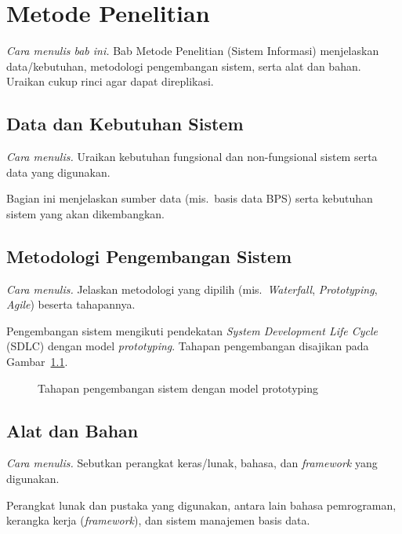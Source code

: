 \chapter{Metode Penelitian}
\emph{Cara menulis bab ini.} Bab Metode Penelitian (Sistem Informasi) menjelaskan data/kebutuhan, metodologi pengembangan sistem, serta alat dan bahan. Uraikan cukup rinci agar dapat direplikasi.


\section{Data dan Kebutuhan Sistem}
\emph{Cara menulis.} Uraikan kebutuhan fungsional dan non-fungsional sistem serta data yang digunakan.

Bagian ini menjelaskan sumber data (mis.\ basis data BPS) serta kebutuhan sistem
yang akan dikembangkan.

\section{Metodologi Pengembangan Sistem}
\emph{Cara menulis.} Jelaskan metodologi yang dipilih (mis.\ \emph{Waterfall}, \emph{Prototyping}, \emph{Agile}) beserta tahapannya.

Pengembangan sistem mengikuti pendekatan \emph{System Development Life Cycle}
(SDLC) dengan model \emph{prototyping}. Tahapan pengembangan disajikan pada
Gambar~\ref{gbr:sdlc}.

\begin{figure}[H]
\centering
{}
\caption{Tahapan pengembangan sistem dengan model prototyping}
\label{gbr:sdlc}
\end{figure}

\section{Alat dan Bahan}
\emph{Cara menulis.} Sebutkan perangkat keras/lunak, bahasa, dan \emph{framework} yang digunakan.

Perangkat lunak dan pustaka yang digunakan, antara lain bahasa pemrograman,
kerangka kerja (\emph{framework}), dan sistem manajemen basis data.
